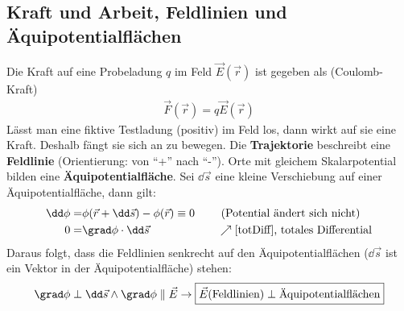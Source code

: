   \subsection{Kraft und Arbeit, Feldlinien und Äquipotentialflächen}
		   Die Kraft auf eine Probeladung $q$ im Feld $\vec{E}(\vec{r} )$ ist gegeben als (Coulomb-Kraft)
		        \begin{equation}\begin{split}
				        \vec{F}(\vec{r} ) = q \vec{E}(\vec{r} )
			        \end{split}\end{equation}
		   Lässt man eine fiktive Testladung (positiv) im Feld los, dann wirkt auf sie eine Kraft. Deshalb fängt sie sich an zu bewegen. Die \textbf{Trajektorie} beschreibt eine \textbf{Feldlinie} (Orientierung: von \enquote{+}
		        nach \enquote{-}). Orte mit gleichem Skalarpotential bilden eine
		        \textbf{Äquipotentialfläche}.
		   Sei $\dd\vec{s}$ eine kleine Verschiebung auf einer
		        Äquipotentialfläche, dann gilt:
		        \begin{align*}
				        \dd \phi = & \phi(\vec{r} +\dd\vec{s}) - \phi(\vec{r} ) \equiv 0\quad &&\text{ (Potential ändert sich nicht)}\\
				        0= & \grad \phi \cdot \dd\vec{s}  &&\nearrow \text{\ref{totDiff}, totales Differential}
			        \end{align*}
		        Daraus folgt, dass die Feldlinien senkrecht auf den Äquipotentialflächen ($\dd\vec{s}$ ist ein Vektor in der Äquipotentialfläche) stehen:
		        \begin{equation}\begin{split}
				        \grad \phi \perp \dd\vec{s} \land \grad \phi \parallel \vec{E} \to
				        \boxed{\vec{E} \text{(Feldlinien)} \perp \text{Äquipotentialflächen}}
			        \end{split}\end{equation}


